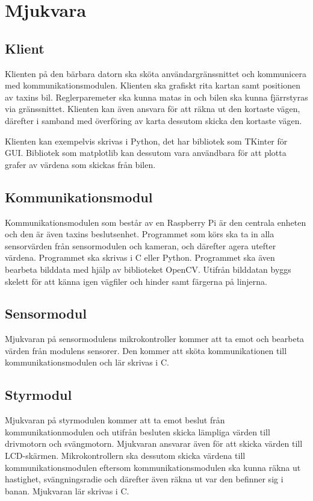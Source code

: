 \documentclass[systemskiss/skiss.tex]{subfiles}
\begin{document}
\section{Mjukvara}
\subsection{Klient}
Klienten på den bärbara datorn ska sköta användargränssnittet och kommunicera
med kommunikationsmodulen. Klienten ska grafiskt rita kartan samt positionen av
taxins bil. Reglerparemeter ska kunna matas in och bilen ska kunna fjärrstyras
via gränssnittet. Klienten kan även ansvara för att räkna ut den kortaste
vägen, därefter i samband med överföring av karta dessutom skicka den kortaste
vägen.

Klienten kan exempelvis skrivas i Python, det har bibliotek som TKinter för
GUI. Bibliotek som matplotlib kan dessutom vara användbara för att plotta
grafer av värdena som skickas från bilen.

\subsection{Kommunikationsmodul}
Kommunikationsmodulen som består av en Raspberry Pi är den centrala enheten och
den är även taxins beslutsenhet. Programmet som körs ska ta in alla
sensorvärden från sensormodulen och kameran, och därefter agera utefter
värdena. Programmet ska skrivas i C eller Python. Programmet ska även bearbeta
bilddata med hjälp av biblioteket OpenCV. Utifrån bilddatan byggs skelett för
att känna igen vägfiler och hinder samt färgerna på linjerna.

\subsection{Sensormodul}
Mjukvaran på sensormodulens mikrokontroller kommer att ta emot och bearbeta
värden från modulens sensorer. Den kommer att sköta kommunikationen till
kommunikationsmodulen och lär skrivas i C.

\subsection{Styrmodul}
Mjukvaran på styrmodulen kommer att ta emot beslut från kommunikationmodulen
och utifrån besluten skicka lämpliga värden till drivmotorn och svängmotorn.
Mjukvaran ansvarar även för att skicka värden till LCD-skärmen.
Mikrokontrollern ska dessutom skicka värdena till kommunikationsmodulen
eftersom kommunikationsmodulen ska kunna räkna ut hastighet, svängningsradie
och därefter även räkna ut var den befinner sig i banan. Mjukvaran lär skrivas
i C.
 
\end{document}
